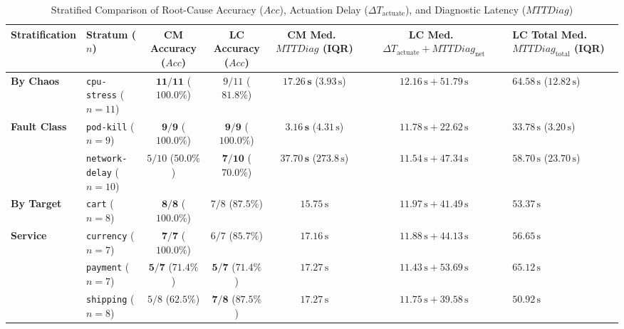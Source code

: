 \begin{table}[!tbp]
\centering
\scriptsize
\setlength{\tabcolsep}{3.5pt}
\renewcommand{\arraystretch}{1.12}
\caption{Stratified Comparison of Root-Cause Accuracy ($Acc$), Actuation Delay ($\Delta T_{\text{actuate}}$), and Diagnostic Latency ($MTTDiag$)}
\label{tab:stratified_cm_vs_litmus}
\begin{tabularx}{\textwidth}{p{2.1cm} p{2.1cm} c c c c X}
\toprule
\textbf{Stratification} & \textbf{Stratum ($n$)} & \textbf{CM Accuracy ($Acc$)} & \textbf{LC Accuracy ($Acc$)} & \textbf{CM Med.\ $MTTDiag$ (IQR)} & \textbf{LC Med.\ $\Delta T_{\text{actuate}} + MTTDiag_{\text{net}}$} & \textbf{LC Total Med.\ $MTTDiag_{\text{total}}$ (IQR)} \\
\midrule
\textbf{By Chaos} & \texttt{cpu-stress} ($n=11$) & $\mathbf{11/11}$ ($\mathbf{100.0\%}$) & $9/11$ ($81.8\%$) & $\mathbf{17.26\,\text{s}}$ ($3.93\,\text{s}$) & $12.16\,\text{s} + 51.79\,\text{s}$ & $64.58\,\text{s}$ ($12.82\,\text{s}$) \\
\textbf{Fault Class} & \texttt{pod-kill} ($n=9$) & $\mathbf{9/9}$ ($\mathbf{100.0\%}$) & $\mathbf{9/9}$ ($\mathbf{100.0\%}$) & $\mathbf{3.16\,\text{s}}$ ($4.31\,\text{s}$) & $11.78\,\text{s} + 22.62\,\text{s}$ & $33.78\,\text{s}$ ($3.20\,\text{s}$) \\
& \texttt{network-delay} ($n=10$) & $5/10$ ($50.0\%$) & $\mathbf{7/10}$ ($\mathbf{70.0\%}$) & $\mathbf{37.70\,\text{s}}$ ($273.8\,\text{s}$) & $11.54\,\text{s} + 47.34\,\text{s}$ & $58.70\,\text{s}$ ($23.70\,\text{s}$) \\
\midrule
\textbf{By Target} & \texttt{cart} ($n=8$) & $\mathbf{8/8}$ ($\mathbf{100.0\%}$) & $7/8$ ($87.5\%$) & $15.75\,\text{s}$ & $11.97\,\text{s} + 41.49\,\text{s}$ & $53.37\,\text{s}$ \\
\textbf{Service} & \texttt{currency} ($n=7$) & $\mathbf{7/7}$ ($\mathbf{100.0\%}$) & $6/7$ ($85.7\%$) & $17.16\,\text{s}$ & $11.88\,\text{s} + 44.13\,\text{s}$ & $56.65\,\text{s}$ \\
& \texttt{payment} ($n=7$) & $\mathbf{5/7}$ ($\mathbf{71.4\%}$) & $\mathbf{5/7}$ ($\mathbf{71.4\%}$) & $17.27\,\text{s}$ & $11.43\,\text{s} + 53.69\,\text{s}$ & $65.12\,\text{s}$ \\
& \texttt{shipping} ($n=8$) & $5/8$ ($62.5\%$) & $\mathbf{7/8}$ ($\mathbf{87.5\%}$) & $17.27\,\text{s}$ & $11.75\,\text{s} + 39.58\,\text{s}$ & $50.92\,\text{s}$ \\
\bottomrule
\end{tabularx}
\end{table}